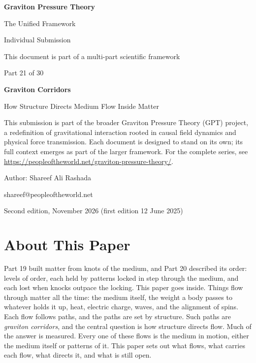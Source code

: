 \documentclass[11pt,a4paper]{article}
\begin{document}
\renewcommand{\thetable}{21.\arabic{table}}
\begin{titlepage}
\centering
\vspace*{1.5cm}
{\Huge\bfseries Graviton Pressure Theory\par}
\vspace{0.4cm}
{\Large The Unified Framework\par}
{\large Individual Submission\par}
\vspace{0.3cm}
{\normalsize This document is part of a multi-part scientific framework\par}
\vspace{1.6cm}
{\large Part 21 of 30\par}
\vspace{0.6cm}
{\huge\bfseries Graviton Corridors\par}
\vspace{0.5cm}
{\Large How Structure Directs Medium Flow Inside Matter\par}
\vspace{1.4cm}
\begin{minipage}{0.82\textwidth}\centering\small
This submission is part of the broader Graviton Pressure Theory (GPT) project, a redefinition of gravitational interaction rooted in causal field dynamics and physical force transmission. Each document is designed to stand on its own; its full context emerges as part of the larger framework. For the complete series, see \url{https://peopleoftheworld.net/graviton-pressure-theory/}.
\end{minipage}
\vfill
{\large Author: Shareef Ali Rashada\par}
{\normalsize shareef@peopleoftheworld.net\par}
\vspace{0.3cm}
{\normalsize Second edition, November 2026 \quad (first edition 12 June 2025)\par}
\end{titlepage}

\tableofcontents
\newpage

\section*{About This Paper}

Part 19 built matter from knots of the medium, and Part 20 described its order: levels of order, each held by patterns locked in step through the medium, and each lost when knocks outpace the locking. This paper goes inside. Things flow through matter all the time: the medium itself, the weight a body passes to whatever holds it up, heat, electric charge, waves, and the alignment of spins. Each flow follows paths, and the paths are set by structure. Such paths are \emph{graviton corridors}, and the central question is how structure directs flow. Much of the answer is measured. Every one of these flows is the medium in motion, either the medium itself or patterns of it. This paper sets out what flows, what carries each flow, what directs it, and what is still open.
\end{document}
